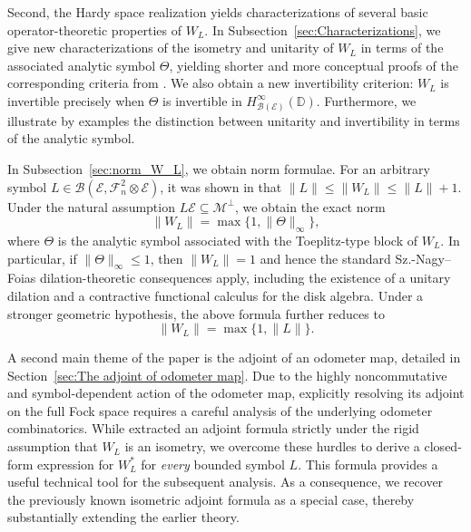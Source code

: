 \documentclass[12pt]{amsart}
\theoremstyle{definition}
\theoremstyle{remark}
\def \D{\mathbb{D}}
\newcommand{\clb}{\mathcal{B}}
\newcommand{\cle}{\mathcal{E}}
\newcommand{\clm}{\mathcal{M}}
\newcommand{\clf}{\mathcal{F}}
\numberwithin{equation}{section}
\begin{document}
Second, the Hardy space realization yields characterizations of several
basic operator-theoretic properties of $W_L$. In
Subsection~\ref{sec:Characterizations}, we give new characterizations of the isometry and unitarity of $W_L$ in terms of the associated analytic symbol $\Theta$, yielding shorter and more conceptual proofs of the corresponding criteria from \cite{mansi2025}. We also obtain a new invertibility criterion: $W_L$ is invertible precisely when $\Theta$ is invertible in $H^\infty_{\clb(\cle)}(\D)$. Furthermore, we illustrate by examples the distinction between unitarity and invertibility in terms of the analytic symbol. 

In Subsection~\ref{sec:norm_W_L}, we obtain norm formulae. For an arbitrary symbol $L\in\clb(\cle,\clf_n^2\otimes\cle)$, it was shown in \cite[Remark~2.4]{mansi2025} that $\|L\|\leq \|W_L\|\leq \|L\|+1.$ Under the natural assumption
$L\cle\subseteq \clm^\perp$, we obtain the exact norm
\[
\|W_L\|=\max\{1,\|\Theta\|_\infty\},
\]
where $\Theta$ is the analytic symbol associated with the Toeplitz-type block of $W_L$. In particular, if \(\|\Theta\|_\infty\leq 1\), then \(\|W_L\|=1\) and hence the standard Sz.-Nagy--Foias dilation-theoretic consequences apply, including the existence of a unitary dilation and a contractive functional calculus for the disk algebra. Under a stronger geometric hypothesis, the above formula further reduces to
\[
\|W_L\|=\max\{1,\|L\|\}.
\]

A second main theme of the paper is the adjoint of an odometer map, detailed in Section~\ref{sec:The adjoint of odometer map}. Due to the highly noncommutative and symbol-dependent action of the odometer map, explicitly resolving its adjoint on the full Fock space requires a careful
analysis of the underlying odometer combinatorics. While \cite{mansi2025} extracted an adjoint formula strictly under the rigid assumption that $W_L$ is an isometry, we overcome these hurdles to derive a closed-form expression for $W_L^*$ for \emph{every} bounded symbol $L$. This formula provides a useful technical tool for the subsequent analysis. As a consequence, we recover the previously known isometric adjoint formula as a special case, thereby substantially extending the earlier theory. 
\end{document}
